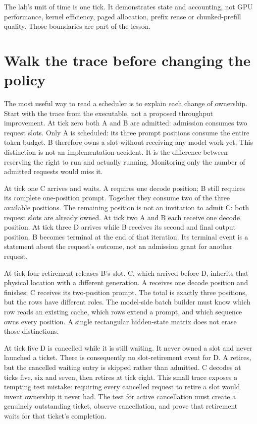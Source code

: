 The lab's unit of time is one tick. It demonstrates state and accounting, not
GPU performance, kernel efficiency, paged allocation, prefix reuse or
chunked-prefill quality. Those boundaries are part of the lesson.

\section{Walk the trace before changing the policy}

The most useful way to read a scheduler is to explain each change of
ownership. Start with the trace from the executable, not a proposed
throughput improvement. At tick zero both A and B are admitted: admission
consumes two request slots. Only A is scheduled: its three prompt positions
consume the entire token budget. B therefore owns a slot without receiving
any model work yet. This distinction is not an implementation accident.
It is the difference between reserving the right to run and actually
running. Monitoring only the number of admitted requests would miss it.

At tick one C arrives and waits. A requires one decode position; B still
requires its complete one-position prompt. Together they consume two of
the three available positions. The remaining position is not an invitation
to admit C: both request slots are already owned. At tick two A and B each
receive one decode position. At tick three D arrives while B receives its
second and final output position. B becomes terminal at the end of that
iteration. Its terminal event is a statement about the request's outcome,
not an admission grant for another request.

At tick four retirement releases B's slot. C, which arrived before D,
inherits that physical location with a different generation. A receives
one decode position and finishes; C receives its two-position prompt.
The total is exactly three positions, but the rows have different roles.
The model-side batch builder must know which row reads an existing cache,
which rows extend a prompt, and which sequence owns every position.
A single rectangular hidden-state matrix does not erase those distinctions.

At tick five D is cancelled while it is still waiting. It never owned a
slot and never launched a ticket. There is consequently no slot-retirement
event for D. A retires, but the cancelled waiting entry is skipped rather
than admitted. C decodes at ticks five, six and seven, then retires at tick
eight. This small trace exposes a tempting test mistake: requiring every
cancelled request to retire a slot would invent ownership it never had.
The test for active cancellation must create a genuinely outstanding
ticket, observe cancellation, and prove that retirement waits for that
ticket's completion.

